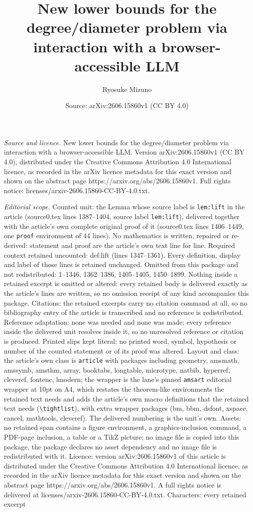 \documentclass[10pt,a4paper]{amsart}
\title[New lower bounds for the degree/diameter problem via interac]{New lower bounds for the degree/diameter problem via interaction with a browser-accessible LLM}
\author{Ryosuke Mizuno}
\date{Source: arXiv:2606.15860v1 (CC BY 4.0)}
\begin{document}
\maketitle

\noindent\emph{Source and licence.} New lower bounds for the degree/diameter problem via interaction with a browser-accessible LLM. Version arXiv:2606.15860v1 (CC BY 4.0), distributed under the Creative Commons Attribution 4.0 International licence, as recorded in the arXiv licence metadata for this exact version and shown on the abstract page https://arxiv.org/abs/2606.15860v1. Full rights notice: licenses/arxiv-2606.15860-CC-BY-4.0.txt.\par\smallskip

\noindent\textit{Editorial scope.} Counted unit: the Lemma whose source label is \texttt{lem:lift} in the article (source0.tex lines 1387--1404, source label \texttt{lem:lift}), delivered together with the article's own complete original proof of it (source0.tex lines 1406--1449, one \texttt{proof} environment of 44 lines). No mathematics is written, repaired or re-derived: statement and proof are the article's own text line for line. Required context retained uncounted: def:lift (lines 1347--1361). Every definition, display and label of those lines is retained unchanged. Omitted from this package and not redistributed: 1--1346, 1362--1386, 1405--1405, 1450--1899. Nothing inside a retained excerpt is omitted or altered: every retained body is delivered exactly as the article's lines are written, so no omission receipt of any kind accompanies this package. Citations: the retained excerpts carry no citation command at all, so no bibliography entry of the article is transcribed and no reference is redistributed. Reference adaptation: none was needed and none was made; every reference inside the delivered unit resolves inside it, so no unresolved reference or citation is produced. Printed slips kept literal: no printed word, symbol, hypothesis or number of the counted statement or of its proof was altered. Layout and class: the article's own class is \texttt{article} with packages including geometry, amsmath, amssymb, amsthm, array, booktabs, longtable, microtype, natbib, hyperref, cleveref, fontenc, lmodern; the wrapper is the lane's pinned \texttt{amsart} editorial wrapper at 10pt on A4, which restates the theorem-like environments the retained text needs and adds the article's own macro definitions that the retained text needs (\texttt{\textbackslash tightlist}), with extra wrapper packages (bm, bbm, dsfont, xspace, cancel, mathtools, cleveref). The delivered numbering is the unit's own. Assets: no retained span contains a figure environment, a graphics-inclusion command, a PDF-page inclusion, a table or a TikZ picture; no image file is copied into this package, the package declares no asset dependency and no image file is redistributed with it. Licence: version arXiv:2606.15860v1 of this article is distributed under the Creative Commons Attribution 4.0 International licence, as recorded in the arXiv licence metadata for this exact version and shown on the abstract page https://arxiv.org/abs/2606.15860v1. A full rights notice is delivered at licenses/arxiv-2606.15860-CC-BY-4.0.txt. Characters: every retained excerpt 
\end{document}
